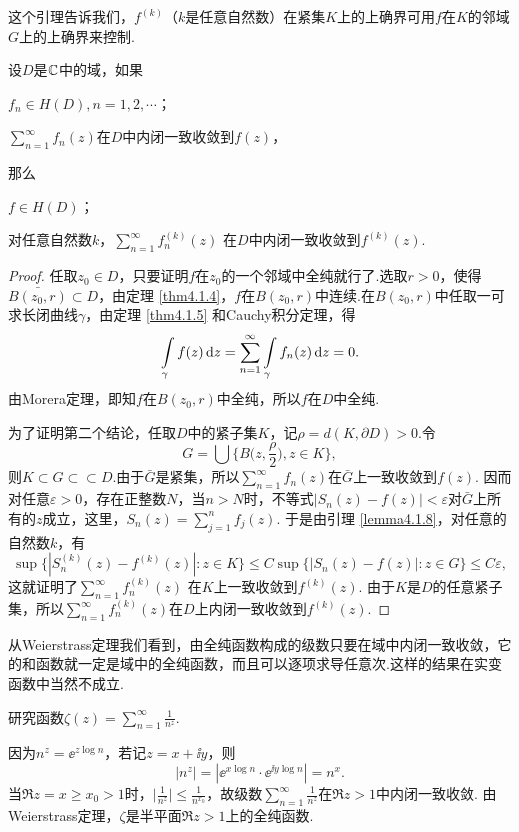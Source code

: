 这个引理告诉我们，$f^{(k)}$（$k$是任意自然数）在紧集$K$上的上确界可用$f$在$K$的邻域$G$上的上确界来控制.
\begin{theorem}\label{thm4.1.9}
  设$D$是$\mathbb C$中的域，如果
  \begin{eenum}
    \item $f_n\in H(D),n=1,2,\cdots$；
    \item $\sum_{n=1}^\infty f_n(z)$在$D$中内闭一致收敛到$f(z)$，
  \end{eenum}
  那么
  \begin{eenum}
    \item $f\in H(D)$；
    \item 对任意自然数$k$，$\sum_{n=1}^\infty f^{(k)}_n(z)$ 在$D$中内闭一致收敛到$f^{(k)}(z)$.
  \end{eenum}
\end{theorem}
\begin{proof}
  任取$z_0\in D$，只要证明$f$在$z_0$的一个邻域中全纯就行了.选取$r>0$，使得$\bar{B(z_0,r)}\subset D$，由定理 \ref{thm4.1.4}，$f$在$B(z_0,r)$中连续.在$B(z_0,r)$中任取一可求长闭曲线$\gamma$，由定理 \ref{thm4.1.5} 和Cauchy积分定理，得
  \[
    \int\limits_\gamma f(z)\mathop{}\!\mathrm dz = \sum_{n=1}^\infty \int\limits_\gamma f_n(z)\mathop{}\!\mathrm dz = 0.
  \]
  由Morera定理，即知$f$在$B(z_0,r)$中全纯，所以$f$在$D$中全纯.

  为了证明第二个结论，任取$D$中的紧子集$K$，记$\rho=d(K,\partial D)>0$.令
  \[
    G = \bigcup\bigg\{ B\bigg(z,\frac\rho2\bigg), z\in K\bigg\},
  \]
  则$K\subset G\subset\subset D$.由于$\bar G$是紧集，所以$\sum_{n=1}^\infty f_n(z)$在$\bar G$上一致收敛到$f(z)$. 因而对任意$\varepsilon>0$，存在正整数$N$，当$n>N$时，不等式$|S_n(z)-f(z)|<\varepsilon$对$\bar G$上所有的$z$成立，这里，$S_n(z)=\sum_{j=1}^nf_j(z)$. 于是由引理 \ref{lemma4.1.8}，对任意的自然数$k$，有
  \[
    \sup\{|S_n^{(k)}(z) - f^{(k)}(z)|:z\in K\}\le C\sup\{|S_n(z) - f(z)|:z\in G\} \le C\varepsilon,
  \]
  这就证明了$\sum_{n=1}^\infty f^{(k)}_n(z)$ 在$K$上一致收敛到$f^{(k)}(z)$. 由于$K$是$D$的任意紧子集，所以$\sum_{n=1}^\infty f_n^{(k)}(z)$在$D$上内闭一致收敛到$f^{(k)}(z)$.
\end{proof}

从Weierstrass定理我们看到，由全纯函数构成的级数只要在域中内闭一致收敛，它的和函数就一定是域中的全纯函数，而且可以逐项求导任意次.这样的结果在实变函数中当然不成立.
\begin{example}\label{exam4.1.10}
  研究函数$\zeta(z)=\sum_{n=1}^\infty\frac1{n^z}$.
\end{example}
\begin{solution}
  因为$n^z=\ee^{z\log n}$，若记$z=x+\ii y$，则
  \[
    |n^z| = |\ee^{x\log n}\cdot\ee^{\ii y\log n}| = n^x.
  \]
  当$\Re z=x\ge x_0>1$时，$\bigg|\frac1{n^z}\bigg|\le\frac1{n^{x_0}}$，故级数$\sum_{n=1}^\infty\frac1{n^z}$在$\Re z>1$中内闭一致收敛. 由Weierstrass定理，$\zeta$是半平面$\Re z>1$上的全纯函数.
\end{solution}

